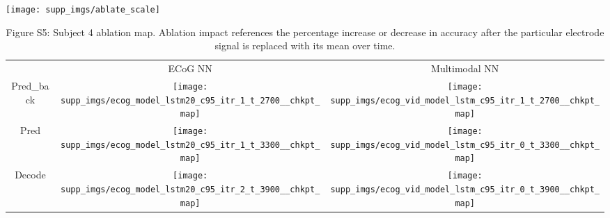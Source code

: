 \documentclass{article}
\begin{document}
\centering
\texttt{[image: supp\_imgs/ablate\_scale]}
\begin{table}[h!]
  \centering
  \begin{adjustbox}{max width=\textwidth}
  \begin{tabular}{  c  c  c  }
    
     & ECoG NN & Multimodal NN \\ 
    Pred\_back &
    \begin{minipage}{.55\textwidth}
      \texttt{[image: supp\_imgs/ecog\_model\_lstm20\_c95\_itr\_1\_t\_2700\_\_chkpt\_map]}
    \end{minipage}
    & 
    \begin{minipage}{.55\textwidth}
      \texttt{[image: supp\_imgs/ecog\_vid\_model\_lstm\_c95\_itr\_1\_t\_2700\_\_chkpt\_map]}
    \end{minipage} \\ 
    
        Pred & 
    \begin{minipage}{.55\textwidth}
      \texttt{[image: supp\_imgs/ecog\_model\_lstm20\_c95\_itr\_1\_t\_3300\_\_chkpt\_map]}
    \end{minipage}
    &
    \begin{minipage}{.55\textwidth}
      \texttt{[image: supp\_imgs/ecog\_vid\_model\_lstm\_c95\_itr\_0\_t\_3300\_\_chkpt\_map]}
    \end{minipage} \\ 
    
        Decode &
    \begin{minipage}{.55\textwidth}
      \texttt{[image: supp\_imgs/ecog\_model\_lstm20\_c95\_itr\_2\_t\_3900\_\_chkpt\_map]}
    \end{minipage}
    &
    \begin{minipage}{.55\textwidth}
      \texttt{[image: supp\_imgs/ecog\_vid\_model\_lstm\_c95\_itr\_0\_t\_3900\_\_chkpt\_map]}
    \end{minipage} \\ 
  \end{tabular}
  \end{adjustbox}
  \caption*{Figure S5: Subject 4 ablation map. Ablation impact references the percentage increase or decrease in accuracy after the particular electrode signal is replaced with its mean over time.}\label{tbl:s4_ablate}
\end{table}
\newpage

    
\end{document}
